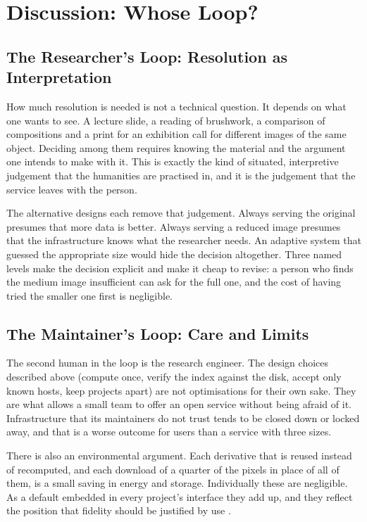 \documentclass{dhnbpub}
\begin{document}
\section{Discussion: Whose Loop?}

\subsection{The Researcher's Loop: Resolution as Interpretation}

How much resolution is needed is not a technical question. It depends
on what one wants to see. A lecture slide, a reading of brushwork, a
comparison of compositions and a print for an exhibition call for
different images of the same object. Deciding among them requires
knowing the material and the argument one intends to make with it. This
is exactly the kind of situated, interpretive judgement that the
humanities are practised in, and it is the judgement that the service
leaves with the person.

The alternative designs each remove that judgement. Always serving the
original presumes that more data is better. Always serving a reduced
image presumes that the infrastructure knows what the researcher
needs. An adaptive system that guessed the appropriate size would hide
the decision altogether. Three named levels make the decision explicit
and make it cheap to revise: a person who finds the medium image
insufficient can ask for the full one, and the cost of having tried the
smaller one first is negligible.

\subsection{The Maintainer's Loop: Care and Limits}

The second human in the loop is the research engineer. The design
choices described above (compute once, verify the index against the
disk, accept only known hosts, keep projects apart) are not
optimisations for their own sake. They are what allows a small team to
offer an open service without being afraid of it. Infrastructure that
its maintainers do not trust tends to be closed down or locked away,
and that is a worse outcome for users than a service with three sizes.

There is also an environmental argument. Each derivative that is
reused instead of recomputed, and each download of a quarter of the
pixels in place of all of them, is a small saving in energy and
storage. Individually these are negligible. As a default embedded in
every project's interface they add up, and they reflect the position
that fidelity should be justified by use \citep{pendergrass2019}.
\end{document}

